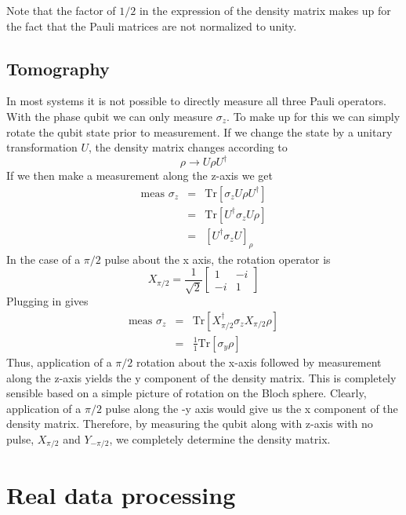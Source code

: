 \documentclass[twocolumn]{article}
\begin{document}
Note that the factor of $1/2$ in the expression of the density matrix makes up for the fact that the Pauli matrices are not normalized to unity.

\subsection{Tomography}

In most systems it is not possible to directly measure all three Pauli operators. With the phase qubit we can only measure $\sigma_z$. To make up for this we can simply rotate the qubit state prior to measurement. If we change the state by a unitary transformation $U$, the density matrix changes according to \begin{equation}
\rho \rightarrow U \rho U^{\dagger} \end{equation}
If we then make a measurement along the z-axis we get \begin{eqnarray}
\textrm{meas }\sigma_z &=& \textrm{Tr} \left[ \sigma_z U \rho U^{\dagger} \right] \\
&=& \textrm{Tr} \left[ U^{\dagger} \sigma_z U \rho \right] \\
&=& \left[ U^{\dagger}\sigma_z U \right]_{\rho} \end{eqnarray}
In the case of a $\pi/2$ pulse about the x axis, the rotation operator is \begin{equation}
X_{\pi/2} = \frac{1}{\sqrt{2}} \left[ \begin{array}{cc} 1 & -i \\ -i & 1\end{array} \right] \end{equation}
Plugging in gives \begin{eqnarray}
\textrm{meas } \sigma_z &=& \textrm{Tr}\left[ X_{\pi/2}^{\dagger} \sigma_z X_{\pi/2} \rho \right] \\
&=& \frac{1}{1} \textrm{Tr}\left[ \sigma_y \rho \right] \end{eqnarray}
Thus, application of a $\pi/2$ rotation about the x-axis followed by measurement along the z-axis yields the y component of the density matrix. This is completely sensible based on a simple picture of rotation on the Bloch sphere. Clearly, application of a $\pi/2$ pulse along the -y axis would give us the x component of the density matrix. Therefore, by measuring the qubit along with z-axis with no pulse, $X_{\pi/2}$ and $Y_{-\pi/2}$, we completely determine the density matrix.

\section{Real data processing}
\end{document}

